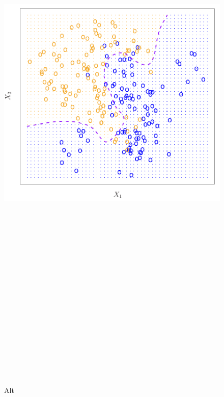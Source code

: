\documentclass[
]{article}
\begin{document}
\begin{figure}
\centering
\includegraphics[width=1\textwidth,height=12.5in]{2.13.pdf}
\caption{Alt}
\end{figure}
\end{document}
